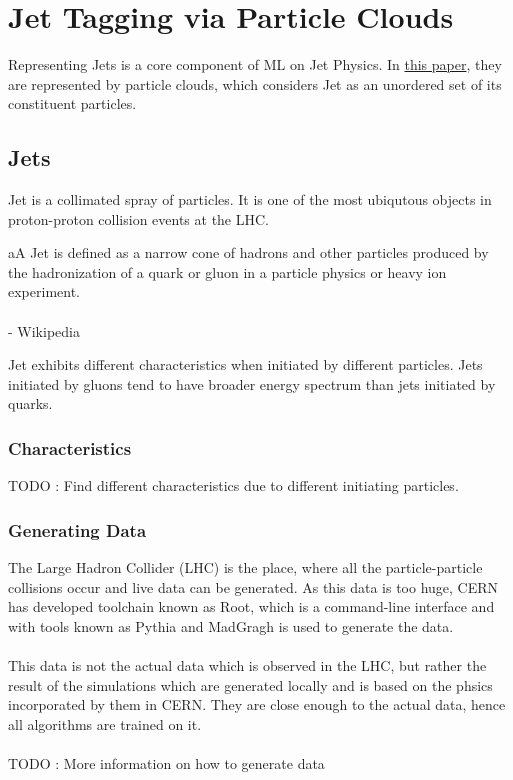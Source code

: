 \chapter{Jet Tagging via Particle Clouds}
Representing Jets is a core component of ML on Jet Physics. In  
\href{run:../papers/Jet\ Tagging\ via\ Particle\ Clouds.pdf}{this paper}, 
they are represented by particle clouds, which considers Jet as an 
unordered set of its constituent particles.

\section{Jets}
Jet is a collimated spray of particles. It is one of the most ubiqutous 
objects in proton-proton collision events at the LHC.

\begin{definition}
    aA Jet is defined as a narrow cone of hadrons and other particles 
    produced by the hadronization of a quark or gluon in a particle physics 
    or heavy ion experiment.
    \\\\
    - Wikipedia
\end{definition}

\noindent Jet exhibits different characteristics when initiated by different 
particles. Jets initiated by gluons tend to have broader energy spectrum 
than jets initiated by quarks.

\subsection{Characteristics}
TODO : Find different characteristics due to different initiating particles.

\subsection{Generating Data}
The Large Hadron Collider (LHC) is the place, where all the particle-particle 
collisions occur and live data can be generated. As this data is too huge, 
CERN has developed toolchain known as Root, which is a command-line 
interface and with tools known as Pythia and MadGragh is used to generate the 
data.
\\\\
This data is not the actual data which is observed in the LHC, but 
rather the result of the simulations which are generated locally and is 
based on the phsics incorporated by them in CERN. They are close 
enough to the actual data, hence all algorithms are trained on it.
\\\\
TODO : More information on how to generate data

